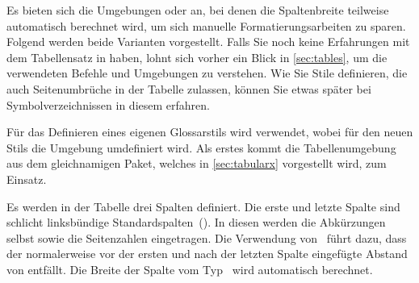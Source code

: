 \documentclass[%
  english,ngerman,%
  cdgeometry=no,DIV=12,automark,%
]{tudscrartcl}
\begin{document}
Es bieten sich die Umgebungen  oder  
an, bei denen die Spaltenbreite teilweise automatisch berechnet wird, um sich 
manuelle Formatierungsarbeiten zu sparen. Folgend werden beide Varianten 
vorgestellt. Falls Sie noch keine Erfahrungen mit dem Tabellensatz in 
 haben, lohnt sich vorher ein Blick in \autoref{sec:tables}, um 
die verwendeten Befehle und Umgebungen zu verstehen. Wie Sie Stile definieren, 
die auch Seitenumbrüche in der Tabelle zulassen, können Sie etwas später bei 
Symbolverzeichnissen in diesem  erfahren.

Für das Definieren eines eigenen Glossarstils wird  
verwendet, wobei für den neuen Stils die Umgebung  
umdefiniert wird. Als erstes kommt die Tabellenumgebung  
aus dem gleichnamigen Paket, welches in \autoref{sec:tabularx} vorgestellt 
wird, zum Einsatz.

Es werden in der Tabelle drei Spalten definiert. Die erste und letzte Spalte 
sind schlicht linksbündige Standardspalten~(). In diesen werden die 
Abkürzungen selbst sowie die Seitenzahlen eingetragen. Die Verwendung 
von~ führt dazu, dass der normalerweise vor der ersten 
und nach der letzten Spalte eingefügte Abstand von  entfällt. 
Die Breite der Spalte vom Typ~ wird automatisch berechnet.
\end{document}
